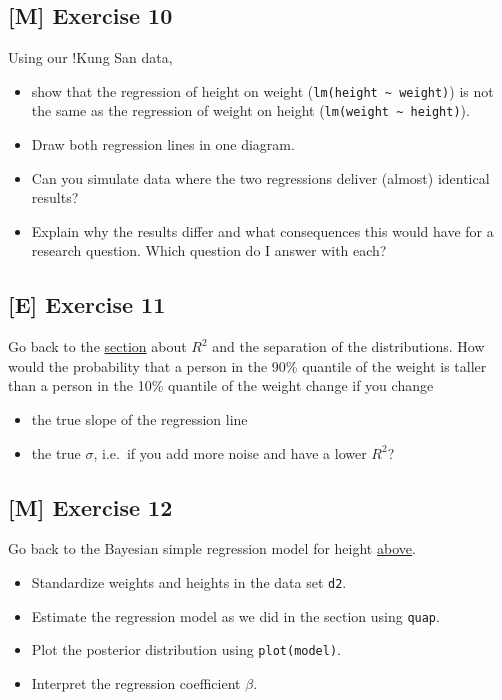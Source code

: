 \documentclass[
]{book}
\providecommand{\tightlist}{%
  \setlength{\itemsep}{0pt}\setlength{\parskip}{0pt}}
\begin{document}
\subsection{{[}M{]} Exercise 10}\label{exercise10_simpl_lin_reg}

Using our !Kung San data,

\begin{itemize}
\tightlist
\item
  show that the regression of height on weight (\texttt{lm(height\ \textasciitilde{}\ weight)})
  is not the same as the regression of weight on height (\texttt{lm(weight\ \textasciitilde{}\ height)}).
\item
  Draw both regression lines in one diagram.
\item
  Can you simulate data where the two regressions deliver (almost) identical results?
\item
  Explain why the results differ and what consequences this would have for a research question.
  Which question do I answer with each?
\end{itemize}

\subsection{{[}E{]} Exercise 11}\label{exercise11_simpl_lin_reg}

Go back to the \hyperref[seperating_property]{section} about \(R^2\) and the separation of the distributions.
How would the probability that a person in the 90\% quantile of the weight
is taller than a person in the 10\% quantile of the weight change if you change

\begin{itemize}
\tightlist
\item
  the true slope of the regression line
\item
  the true \(\sigma\), i.e.~if you add more noise and have a lower \(R^2\)?
\end{itemize}

\subsection{{[}M{]} Exercise 12}\label{exercise12_simpl_lin_reg}

Go back to the Bayesian simple regression model for height \hyperref[simple_lin_reg_bayes]{above}.

\begin{itemize}
\tightlist
\item
  Standardize weights and heights in the data set \texttt{d2}.
\item
  Estimate the regression model as we did in the section using \texttt{quap}.
\item
  Plot the posterior distribution using \texttt{plot(model)}.
\item
  Interpret the regression coefficient \(\beta\).
\end{itemize}
\end{document}
